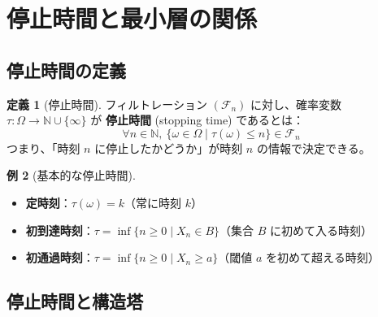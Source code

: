 \documentclass[a4paper,12pt]{ltjsarticle}
\theoremstyle{definition}
\newtheorem{definition}{定義}[section]
\newtheorem{example}[definition]{例}
\begin{document}
\section{停止時間と最小層の関係}

\subsection{停止時間の定義}

\begin{definition}[停止時間]\label{def:stopping-time}
フィルトレーション $(\mathcal{F}_n)$ に対し、確率変数 $\tau: \Omega \to \mathbb{N} \cup \{\infty\}$ が
\textbf{停止時間} (stopping time) であるとは：
\[
  \forall n \in \mathbb{N},\ \{\omega \in \Omega \mid \tau(\omega) \leq n\} \in \mathcal{F}_n
\]
つまり、「時刻 $n$ に停止したかどうか」が時刻 $n$ の情報で決定できる。
\end{definition}

\begin{example}[基本的な停止時間]
\begin{itemize}
  \item \textbf{定時刻}：$\tau(\omega) = k$（常に時刻 $k$）
  \item \textbf{初到達時刻}：$\tau = \inf\{ n \geq 0 \mid X_n \in B \}$（集合 $B$ に初めて入る時刻）
  \item \textbf{初通過時刻}：$\tau = \inf\{ n \geq 0 \mid X_n \geq a \}$（閾値 $a$ を初めて超える時刻）
\end{itemize}
\end{example}

\subsection{停止時間と構造塔}
\end{document}
